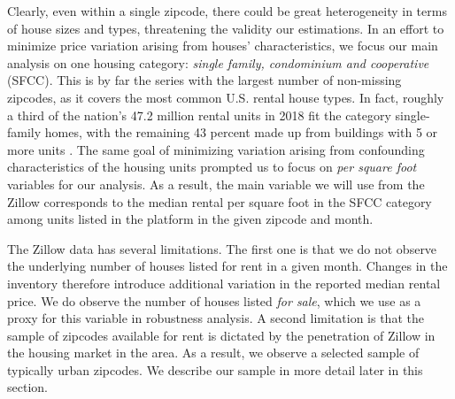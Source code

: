 Clearly, even within a single zipcode, there could be great heterogeneity in terms of 
house sizes and types, threatening the validity our estimations. In an effort to 
minimize price variation arising from houses' characteristics, we focus our main 
analysis on one housing category: \textit{single family, condominium and cooperative} 
(SFCC). This is by far the series with the largest number of non-missing zipcodes, as 
it covers the most common U.S. rental house types. In fact, roughly a third of the 
nation's 47.2 million rental units in 2018 fit the category single-family homes, with 
the remaining 43 percent made up from buildings with 5 or more units 
\parencite{JCHS2020}. The same goal of minimizing variation arising from confounding
characteristics of the housing units prompted us to focus on \textit{per square foot} 
variables for our analysis. As a result, the main variable we will use from the Zillow
corresponds to the median rental per square foot in the SFCC category among units 
listed in the platform in the given zipcode and month.

The Zillow data has several limitations. The first one is that we do not observe the 
underlying number of houses listed for rent in a given month. Changes in the inventory 
therefore introduce additional variation in the reported median rental price. We do 
observe the number of houses listed \textit{for sale}, which we use as a proxy for this 
variable in robustness analysis. A second limitation is that the sample of zipcodes 
available for rent is dictated by the penetration of Zillow in the housing market in the 
area. As a result, we observe a selected sample of typically urban zipcodes. We describe 
our sample in more detail later in this section.

